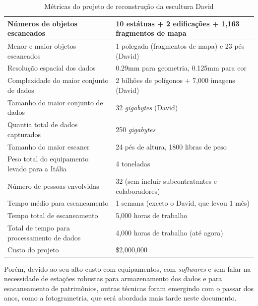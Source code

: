 \begin{table}
\caption{Métricas do projeto de reconstrução da escultura David}
\label{tab:metricasDavid}
\begin{tabular}{|l|p{4.7cm}|}
\hline
Números de objetos escaneados          & 10 estátuas + 2 edificações + 1,163 fragmentos de mapa  \\ \hline
Menor e maior objetos escaneados       & 1 polegada (fragmentos de mapa) e 23 pés (David)         \\ \hline
Resolução espacial dos dados                & 0.29mm para geometria, 0.125mm para cor              \\ \hline
Complexidade do maior conjunto de dados             & 2 bilhões de polígonos + 7,000 imagens (David)\\ \hline
Tamanho do maior conjunto de dados                    & 32 {\it gigabytes} (David)                  \\ \hline
Quantia total de dados capturados              & 250 {\it gigabytes}                                 \\ \hline
Tamanho do maior escaner                    & 24 pés de altura, 1800 libras de peso                  \\ \hline
Peso total do equipamento levado para a Itália & 4 toneladas                                              \\ \hline
Número de pessoas envolvidas                  & 32 (sem incluir subcontratantes e colaboradores) \\ \hline
Tempo médio para escaneamento              & 1 semana (exceto o David, que levou 1 mês)       \\ \hline
Tempo total de escaneamento                 & 5,000 horas de trabalho                                   \\ \hline
Total de tempo para processamento de dados          & 4,000 horas de trabalho (até agora)                            \\ \hline
Custo do projeto                          & \$2,000,000                                         \\ \hline
\end{tabular}
\end{table}
Porém, devido ao seu alto custo com equipamentos, com {\it softwares} e sem falar na necessidade de estações robustas para armazenamento dos dados e para esacaneamento de patrimônios, outras técnicas foram emergindo com o passar dos anos, como a fotogrametria, que será abordada mais tarde neste documento.

